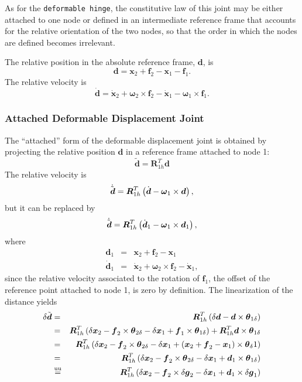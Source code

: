 \documentclass[10pt,dvips,fleqn,subeqn]{report}
\newcommand{\T}[1]{\boldsymbol{#1}}
\newcommand{\equu}{\overset{\text{uu}}{=}}
\begin{document}
As for the \texttt{deformable hinge}, the constitutive law of this joint
may be either attached to one node or defined in an intermediate
reference frame that accounts for the relative orientation of the two nodes,
so that the order in which the nodes are defined becomes irrelevant.

The relative position in the absolute reference frame, $\T{d}$, is
\begin{equation}
	\T{d} = \T{x}_2 + \T{f}_2 - \T{x}_1 - \T{f}_1 .
\end{equation}
The relative velocity is
\begin{equation}
	\dot{\T{d}} = \dot{\T{x}}_2 + \T{\omega}_2 \times \T{f}_2
		- \dot{\T{x}}_1 - \T{\omega}_1 \times \T{f}_1 .
\end{equation}

\subsubsection{Attached Deformable Displacement Joint}
The ``attached'' form of the deformable displacement joint
is obtained by projecting the relative position $\T{d}$
in a reference frame attached to node 1:
\begin{equation}
	\tilde{\T{d}} = \T{R}_{1h}^T \T{d}
\end{equation}
The relative velocity is
\begin{equation}
	\dot{\tilde{\T{d}}} = \T{R}_{1h}^T\plbr{
		\dot{\T{d}} - \T{\omega}_1 \times \T{d}
	} ,
\end{equation}
but it can be replaced by
\begin{equation}
	\dot{\tilde{\T{d}}} = \T{R}_{1h}^T\plbr{
		\dot{\T{d}}_1 - \T{\omega}_1 \times \T{d}_1
	} ,
\end{equation}
where
\begin{eqnarray*}
	\T{d}_1 & = & \T{x}_2 + \T{f}_2 - \T{x}_1 \\
	\dot{\T{d}}_1 & = & \dot{\T{x}}_2 + \T{\omega}_2 \times \T{f}_2 - \dot{\T{x}}_1 ,
\end{eqnarray*}
since the relative velocity associated to the rotation of $\T{f}_1$,
the offset of the reference point attached to node 1,
is zero by definition.
The linearization of the distance yields
\begin{eqnarray*}
	\delta{\tilde{\T{d}}} & = & \T{R}_{1h}^T\plbr{
		\delta\T{d} - \T{d} \times \T{\theta}_{1\delta}
	} \\
	& = & \T{R}_{1h}^T\plbr{
		\delta{\T{x}}_2 - \T{f}_2\times\T{\theta}_{2\delta}
		- \delta{\T{x}}_1 + \T{f}_1\times\T{\theta}_{1\delta}
	} + \T{R}_{1h}^T \T{d}\times\T{\theta}_{1\delta} \\
	& = & \T{R}_{1h}^T\plbr{
		\delta{\T{x}}_2
		- \T{f}_2\times\T{\theta}_{2\delta}
		- \delta{\T{x}}_1
		+ \plbr{
			\T{x}_2
			+ \T{f}_2
			- \T{x}_1
		}\times\T{\theta}_{\delta}1
	} \\
	& = & \T{R}_{1h}^T\plbr{
		\delta{\T{x}}_2
		- \T{f}_2\times\T{\theta}_{2\delta}
		- \delta{\T{x}}_1
		+ \T{d}_1\times\T{\theta}_{1\delta}
	} \\
	& \equu & \T{R}_{1h}^T\plbr{
		\delta{\T{x}}_2
		- \T{f}_2\times\delta\T{g}_2
		- \delta{\T{x}}_1
		+ \T{d}_1\times\delta\T{g}_1
	}
\end{eqnarray*}
\end{document}
